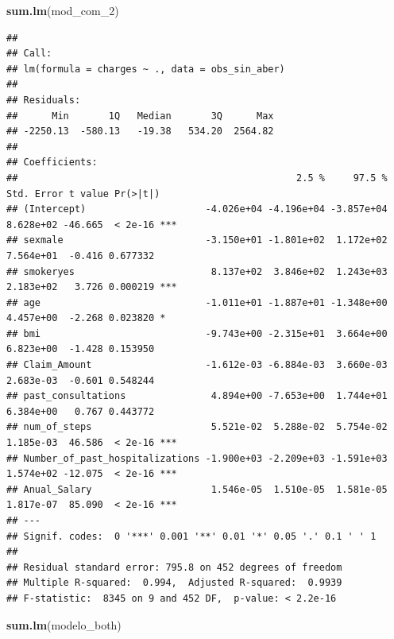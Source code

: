 \documentclass[
]{article}
\newenvironment{Shaded}{\begin{snugshade}}{\end{snugshade}}
\newcommand{\FunctionTok}[1]{\textcolor[rgb]{0.13,0.29,0.53}{\textbf{#1}}}
\newcommand{\NormalTok}[1]{#1}
\begin{document}
\begin{Shaded}
\begin{Highlighting}[]
\FunctionTok{sum.lm}\NormalTok{(mod\_com\_2)}
\end{Highlighting}
\end{Shaded}

\begin{verbatim}
## 
## Call:
## lm(formula = charges ~ ., data = obs_sin_aber)
## 
## Residuals:
##      Min       1Q   Median       3Q      Max 
## -2250.13  -580.13   -19.38   534.20  2564.82 
## 
## Coefficients:
##                                                 2.5 %     97.5 % Std. Error t value Pr(>|t|)    
## (Intercept)                     -4.026e+04 -4.196e+04 -3.857e+04  8.628e+02 -46.665  < 2e-16 ***
## sexmale                         -3.150e+01 -1.801e+02  1.172e+02  7.564e+01  -0.416 0.677332    
## smokeryes                        8.137e+02  3.846e+02  1.243e+03  2.183e+02   3.726 0.000219 ***
## age                             -1.011e+01 -1.887e+01 -1.348e+00  4.457e+00  -2.268 0.023820 *  
## bmi                             -9.743e+00 -2.315e+01  3.664e+00  6.823e+00  -1.428 0.153950    
## Claim_Amount                    -1.612e-03 -6.884e-03  3.660e-03  2.683e-03  -0.601 0.548244    
## past_consultations               4.894e+00 -7.653e+00  1.744e+01  6.384e+00   0.767 0.443772    
## num_of_steps                     5.521e-02  5.288e-02  5.754e-02  1.185e-03  46.586  < 2e-16 ***
## Number_of_past_hospitalizations -1.900e+03 -2.209e+03 -1.591e+03  1.574e+02 -12.075  < 2e-16 ***
## Anual_Salary                     1.546e-05  1.510e-05  1.581e-05  1.817e-07  85.090  < 2e-16 ***
## ---
## Signif. codes:  0 '***' 0.001 '**' 0.01 '*' 0.05 '.' 0.1 ' ' 1
## 
## Residual standard error: 795.8 on 452 degrees of freedom
## Multiple R-squared:  0.994,  Adjusted R-squared:  0.9939 
## F-statistic:  8345 on 9 and 452 DF,  p-value: < 2.2e-16
\end{verbatim}

\begin{Shaded}
\begin{Highlighting}[]
\FunctionTok{sum.lm}\NormalTok{(modelo\_both)}
\end{Highlighting}
\end{Shaded}
\end{document}
